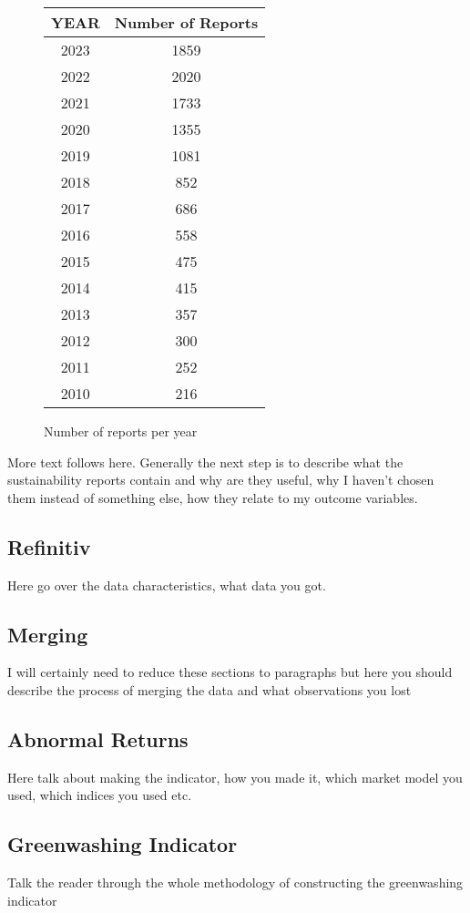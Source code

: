 \documentclass[12pt]{article}
\begin{document}
\begin{wrapfigure}{l}{0.5\textwidth}
    \caption{Number of reports per year}\label{tab:sust_reps}
    \begin{tabular}{cc}
        \toprule
        YEAR & Number of Reports\\
        \midrule
        2023 & 1859\\
        2022 & 2020\\
        2021 & 1733\\
        2020 & 1355\\
        2019 & 1081\\
        2018 & 852\\
        2017 & 686\\
        2016 & 558\\
        2015 & 475\\
        2014 & 415\\
        2013 & 357\\
        2012 & 300\\
        2011 & 252\\
        2010 & 216\\
        \bottomrule
    \end{tabular}
\end{wrapfigure}

More text follows here. Generally the next step is to describe what the sustainability reports contain and why are they useful, why I haven't chosen them instead of something else, how they relate to my outcome variables. 
\subsection{Refinitiv}

Here go over the data characteristics, what data you got.

\subsection{Merging}
I will certainly need to reduce these sections to paragraphs but here you should describe the process of merging the data and what observations you lost 
\subsection{Abnormal Returns}

Here talk about making the indicator, how you made it, which market model you used, which indices you used etc. 
\subsection{Greenwashing Indicator}
Talk the reader through the whole methodology of constructing the greenwashing indicator
\end{document}
